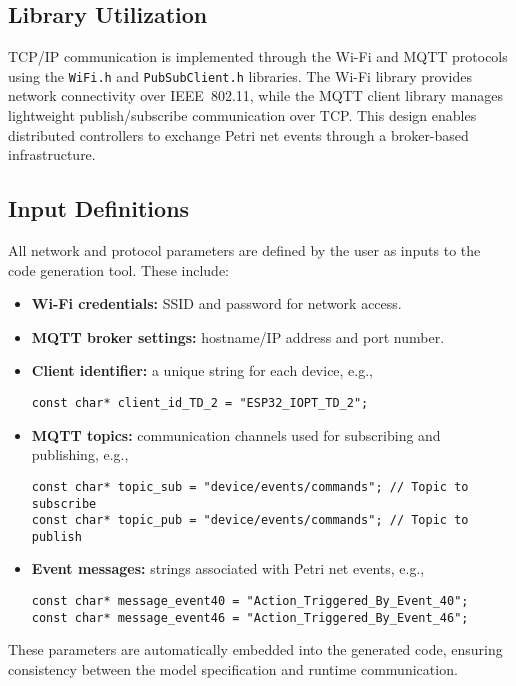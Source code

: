 \subsection{Library Utilization}
TCP/IP communication is implemented through the Wi-Fi and MQTT protocols using the \texttt{WiFi.h} and \texttt{PubSubClient.h} libraries. The Wi-Fi library provides network connectivity over IEEE~802.11, while the MQTT client library manages lightweight publish/subscribe communication over TCP. This design enables distributed controllers to exchange Petri net events through a broker-based infrastructure.

\subsection{Input Definitions}
All network and protocol parameters are defined by the user as inputs to the code generation tool. These include:
\begin{itemize}
    \item \textbf{Wi-Fi credentials:} SSID and password for network access.
    \item \textbf{MQTT broker settings:} hostname/IP address and port number.
    \item \textbf{Client identifier:} a unique string for each device, e.g.,
\begin{verbatim}
const char* client_id_TD_2 = "ESP32_IOPT_TD_2";
\end{verbatim}
    \item \textbf{MQTT topics:} communication channels used for subscribing and publishing, e.g.,
\begin{verbatim}
const char* topic_sub = "device/events/commands"; // Topic to subscribe
const char* topic_pub = "device/events/commands"; // Topic to publish
\end{verbatim}
    \item \textbf{Event messages:} strings associated with Petri net events, e.g.,
\begin{verbatim}
const char* message_event40 = "Action_Triggered_By_Event_40";
const char* message_event46 = "Action_Triggered_By_Event_46";
\end{verbatim}
\end{itemize}
These parameters are automatically embedded into the generated code, ensuring consistency between the model specification and runtime communication.


